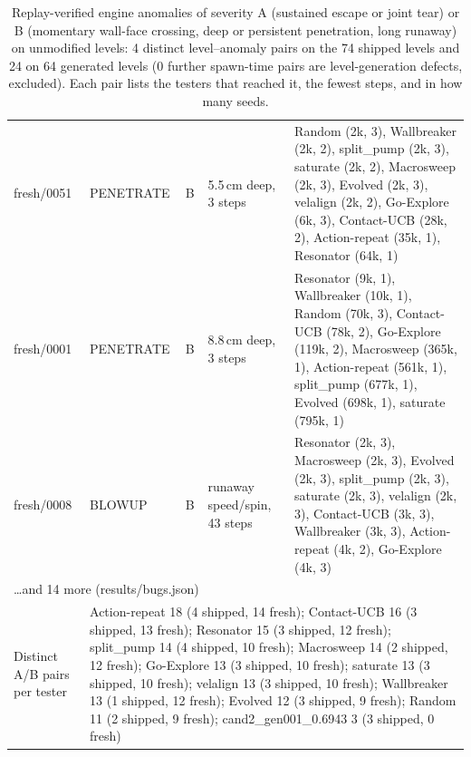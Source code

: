 \begin{table}[t]
\begin{tabular}{llllp{5.6cm}}
fresh/0051 & PENETRATE & B & 5.5\,cm deep, 3 steps & Random (2k, 3), Wallbreaker (2k, 2), split\_pump (2k, 3), saturate (2k, 2), Macrosweep (2k, 3), Evolved (2k, 3), velalign (2k, 2), Go-Explore (6k, 3), Contact-UCB (28k, 2), Action-repeat (35k, 1), Resonator (64k, 1) \\
fresh/0001 & PENETRATE & B & 8.8\,cm deep, 3 steps & Resonator (9k, 1), Wallbreaker (10k, 1), Random (70k, 3), Contact-UCB (78k, 2), Go-Explore (119k, 2), Macrosweep (365k, 1), Action-repeat (561k, 1), split\_pump (677k, 1), Evolved (698k, 1), saturate (795k, 1) \\
fresh/0008 & BLOWUP & B & runaway speed/spin, 43 steps & Resonator (2k, 3), Macrosweep (2k, 3), Evolved (2k, 3), split\_pump (2k, 3), saturate (2k, 3), velalign (2k, 3), Contact-UCB (3k, 3), Wallbreaker (3k, 3), Action-repeat (4k, 2), Go-Explore (4k, 3) \\
\multicolumn{5}{l}{\ldots and 14 more (results/bugs.json)} \\
\midrule
Distinct A/B pairs per tester & \multicolumn{4}{l}{Action-repeat 18 (4 shipped, 14 fresh); Contact-UCB 16 (3 shipped, 13 fresh); Resonator 15 (3 shipped, 12 fresh); split\_pump 14 (4 shipped, 10 fresh); Macrosweep 14 (2 shipped, 12 fresh); Go-Explore 13 (3 shipped, 10 fresh); saturate 13 (3 shipped, 10 fresh); velalign 13 (3 shipped, 10 fresh); Wallbreaker 13 (1 shipped, 12 fresh); Evolved 12 (3 shipped, 9 fresh); Random 11 (2 shipped, 9 fresh); cand2\_gen001\_0.6943 3 (3 shipped, 0 fresh)} \\
\bottomrule
\end{tabular}
\caption{Replay-verified engine anomalies of severity A (sustained escape or joint tear) or B (momentary wall-face crossing, deep or persistent penetration, long runaway) on unmodified levels: 4 distinct level--anomaly pairs on the 74 shipped levels and 24 on 64 generated levels (0 further spawn-time pairs are level-generation defects, excluded). Each pair lists the testers that reached it, the fewest steps, and in how many seeds.}
\label{tab:bugs}
\end{table}
